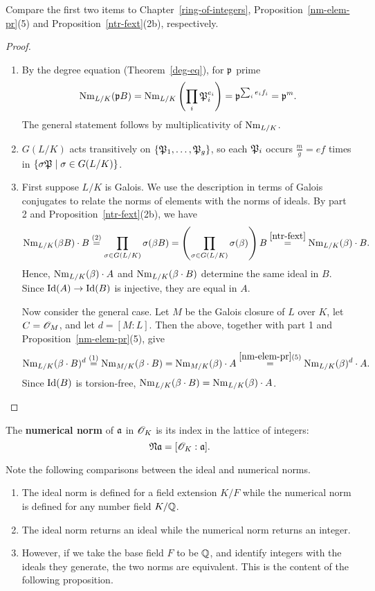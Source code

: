 Compare the first two items to Chapter~\ref{ring-of-integers}, Proposition~\ref{nm-elem-pr}(5) and Proposition~\ref{ntr-fext}(2b), respectively.
\begin{proof}$\,$
\begin{enumerate}
\item
By the degree equation (Theorem~\ref{deg-eq}), for $\mathfrak{p}$ prime
\[
\operatorname{Nm}_{L/K}(\mathfrak{p} B)=\operatorname{Nm}_{L/K}\left( {\prod_i \mathfrak{P}_i^{e_i}} \right)=\mathfrak{p}^{\sum_{i} e_if_i}=\mathfrak{p}^m.
\]
The general statement follows by multiplicativity of $\operatorname{Nm}_{L/K}$.
\item $G(L/K)$ acts transitively on $\{\mathfrak{P}_1,\ldots, \mathfrak{P}_g\}$, so each $\mathfrak{P}_i$ occurs $\frac{m}{g}=ef$ times in $\{\sigma \mathfrak{P}\mid \sigma\in G(L/K)\}$.
\item 
First suppose $L/K$ is Galois. We use the description in terms of Galois conjugates to relate the norms of elements with the norms of ideals.
By part 2 and Proposition~\ref{ntr-fext}(2b), we have
\[
\operatorname{Nm}_{L/K}(\beta B)\cdot B\stackrel{(2)}=\prod_{\sigma\in G(L/K)} \sigma(\beta B) =\left( {\prod_{\sigma\in G(L/K)}\sigma(\beta)} \right)B\stackrel{\ref{ntr-fext}}=\operatorname{Nm}_{L/K}(\beta) \cdot B.
\]
Hence, $\operatorname{Nm}_{L/K}(\beta)\cdot A$ and $\operatorname{Nm}_{L/K}(\beta\cdot B)$ determine the same ideal in $B$. Since $\operatorname{Id}(A)\to \operatorname{Id}(B)$ is injective, they are equal in $A$.

Now consider the general case. Let $M$ be the Galois closure of $L$ over $K$, let $C=\mathscr{O}_M$, and let $d=[M:L]$. Then the above, together with part 1 and Proposition~\ref{nm-elem-pr}(5), give
\[
\operatorname{Nm}_{L/K}(\beta\cdot B)^d\stackrel{(1)}= \operatorname{Nm}_{M/K}(\beta\cdot B)=\operatorname{Nm}_{M/K}(\beta) \cdot A \stackrel{\ref{nm-elem-pr}(5)}= \operatorname{Nm}_{L/K}(\beta)^d\cdot A.
\]
Since $\operatorname{Id}(B)$ is torsion-free, $\operatorname{Nm}_{L/K}(\beta\cdot B)=\operatorname{Nm}_{L/K}(\beta)\cdot A$.\qedhere
\end{enumerate}
\end{proof}
\begin{df}
The \textbf{numerical norm} of $\mathfrak{a}$ in $\mathscr{O}_K$ is its index in the lattice of integers:
\[
\mathfrak N \mathfrak{a} =[\mathscr{O}_K:\mathfrak{a}].
\]
\end{df}
Note the following comparisons between the ideal and numerical norms.
\begin{enumerate}
\item The ideal norm is defined for a field extension $K/F$ while the numerical norm is defined for any number field $K/\mathbb{Q}$.
\item The ideal norm returns an ideal while the numerical norm returns an integer.
\item However, if we take the base field $F$ to be $\mathbb{Q}$, and identify integers with the ideals they generate, the two norms are equivalent. This is the content of the following proposition.
\end{enumerate}
